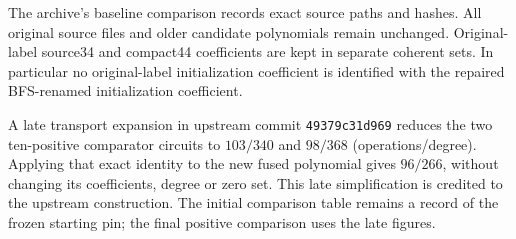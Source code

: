 The archive's baseline comparison records exact source paths and hashes.
All original source files and older candidate polynomials remain unchanged.
Original-label source34 and compact44 coefficients are kept in separate
coherent sets. In particular no original-label initialization coefficient
is identified with the repaired BFS-renamed initialization coefficient.

A late transport expansion in upstream commit \texttt{49379c31d969}
reduces the two ten-positive comparator circuits to $103/340$ and $98/368$
(operations/degree). Applying that exact identity to the new fused
polynomial gives $96/266$, without changing its coefficients, degree or
zero set. This late simplification is credited to the upstream construction.
The initial comparison table remains a record of the frozen starting pin;
the final positive comparison uses the late figures.
